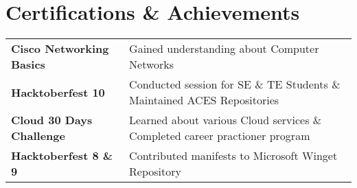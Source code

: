 \documentclass[a4paper,10pt]{article}
\begin{document}
\section{Certifications \& Achievements}




\begin{tabularx}{\linewidth}{@{}l X@{}}
\textbf{Cisco Networking Basics} &  \normalsize{Gained understanding about Computer Networks}\\
\textbf{Hacktoberfest 10}  &  \normalsize{Conducted session for SE \& TE Students \& Maintained ACES Repositories }\\
\textbf{Cloud 30 Days Challenge} &  \normalsize{Learned about various Cloud services \& Completed career practioner program}\\
\textbf{Hacktoberfest 8 \& 9} & \normalsize{Contributed manifests to Microsoft Winget Repository}
\end{tabularx}

\end{document}
